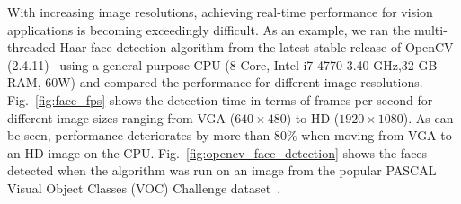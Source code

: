 With increasing image resolutions, achieving real-time performance for vision applications is becoming exceedingly difficult. 
As an example, we ran the multi-threaded Haar face detection algorithm from the latest 
stable release of OpenCV (2.4.11)~\cite{OpenCV} using 
a general purpose CPU (8 Core, Intel i7-4770 3.40 GHz,32 GB RAM, 60W) and compared the performance 
for different image resolutions.
Fig.~\ref{fig:face_fps} shows the detection time in terms of frames per second  for different image sizes ranging from VGA ($640\times480$) 
to HD ($1920\times1080$).
As can be seen, performance deteriorates by more than 80\% when moving from VGA to an HD image on the CPU.
Fig.~\ref{fig:opencv_face_detection} shows the faces detected when the algorithm was run on an image 
from the popular PASCAL Visual Object Classes (VOC) Challenge dataset~\cite{Everingham2010}.

